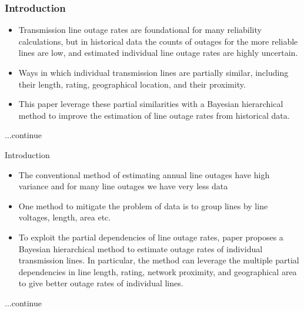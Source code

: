 \documentclass{beamer}
\begin{document}
\begin{frame}
\frametitle{Introduction}
\begin{block}{}
\begin{itemize}
  \item Transmission line outage rates are foundational for
many reliability calculations, but in historical data the
counts of outages for the more reliable lines are low, and estimated individual line outage rates are highly uncertain.
  \item Ways in which individual transmission lines are partially similar, including their length, rating, geographical location, and their proximity. 
  \item This paper leverage these partial similarities with a
Bayesian hierarchical method to improve the estimation of line
outage rates from historical data.
  
\end{itemize}
\begin{flushright}
...continue
\end{flushright}

\end{block}


\end{frame}
\begin{frame}{Introduction}
\begin{block}{}
\begin{itemize}
    \item The conventional method of estimating annual line outages have high variance and for many line outages we have very less data 
    \item One method to mitigate the problem of data is to group lines by line voltages, length, area etc.
    \item To exploit the partial
dependencies of line outage rates, paper proposes a Bayesian hierarchical method to estimate outage rates of individual transmission lines. In particular, the method can leverage the multiple partial dependencies in line length, rating, network proximity,
and geographical area to give better outage rates of individual
lines. 
\end{itemize}
\begin{flushright}
...continue
\end{flushright}

\end{block}
\end{frame}
\end{document}
